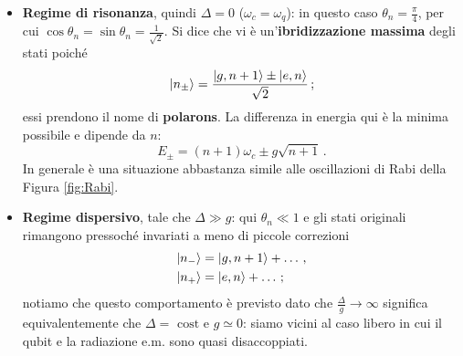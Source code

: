 \begin{itemize}
    \item \textbf{Regime di risonanza}, quindi $\Delta = 0$ ($\omega_c=\omega_q$): in questo caso $\theta_n=\frac \pi 4$, per cui $\cos\theta_n=\sin\theta_n=\frac1{\sqrt2}$. Si dice che vi è un'\textbf{ibridizzazione massima} degli stati poiché
    \begin{equation*}
        \ket{n_\pm}= \frac{\ket{g,n+1}\pm\ket{e,n}}{\sqrt 2} \, ;
    \end{equation*}
    essi prendono il nome di \textbf{polarons}. La differenza in energia qui è la minima possibile e dipende da $n$:
    \begin{equation*}
        E_\pm = (n+1)\omega_c \pm g \sqrt{n+1} \, .
    \end{equation*}
    In generale è una situazione abbastanza simile alle oscillazioni di Rabi della Figura \ref{fig:Rabi}.
    
    \item \textbf{Regime dispersivo}, tale che $\Delta \gg g$: qui $\theta_n\ll 1$ e gli stati originali rimangono pressoché invariati a meno di piccole correzioni
    \begin{align*}
        \ket{n_-} &= \ket{g,n+1} + \dots \, , \\
        \ket{n_+} &= \ket{e,n} + \dots \, ;
    \end{align*}
    notiamo che questo comportamento è previsto dato che $\frac{\Delta}{g} \to \infty$ significa equivalentemente che $\Delta = \text{ cost}$ e $g \simeq 0$: siamo vicini al caso libero in cui il qubit e la radiazione e.m. sono quasi disaccoppiati. 


\end{itemize}
